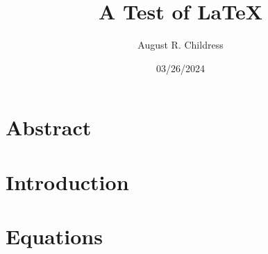 \documentclass{article}
\author{August R. Childress}
\title{A Test of LaTeX}
\date{03/26/2024}
\begin{document}
\maketitle

\section{Abstract}


\section{Introduction}


\section{Equations}







\end{document}
